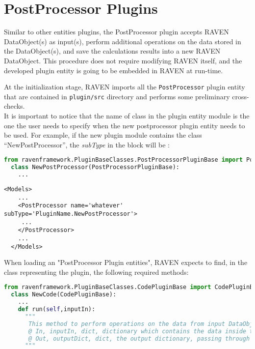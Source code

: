 \section{PostProcessor Plugins}
\label{sec:postprocessorPlugins}

Similar to other entities plugins, the PostProcessor plugin accepts RAVEN DataObject(s) as input(s),
perform additional operations on the data stored in the DataObject(s), and save the calculations
results into a new RAVEN DataObject. This procedure does not require modifying RAVEN itself, and the
developed plugin entity is going to be embedded in RAVEN at run-time.

At the initialization stage, RAVEN imports all the \texttt{PostProcessor} plugin entity that are contained in
\texttt{plugin/src} directory and performs some preliminary cross-checks.
\\It is important to notice that the name of class in the plugin entity module is the one
the user needs to specify when the new postprocessor plugin entity needs to be used.
For example, if the new plugin module contains the class ``NewPostProcessor'',
the \textit{subType} in the  block will be :
\begin{lstlisting}[language=python, basicstyle=\scriptsize\ttfamily, breaklines=True, columns=fullflexible]
  from ravenframework.PluginBaseClasses.PostProcessorPluginBase import PostProcessorPluginBase
  class NewPostProcessor(PostProcessorPluginBase):
    ...
\end{lstlisting}
\begin{lstlisting}[style=XML,morekeywords={name,file}] %moreemph={name,file}]
  <Models>
    ...
    <PostProcessor name='whatever' subType='PluginName.NewPostProcessor'>
     ...
    </PostProcessor>
    ...
  </Models>
\end{lstlisting}

When loading an "PostProcessor Plugin entities", RAVEN expects to find, in the class
representing the plugin, the following required methods:
\begin{lstlisting}[language=python, basicstyle=\scriptsize\ttfamily, breaklines=True, columns=fullflexible]
  from ravenframework.PluginBaseClasses.CodePluginBase import CodePluginBase
  class NewCode(CodePluginBase):
    ...
    def run(self,inputIn):
      """
       This method to perform operations on the data from input DataObject(s)
       @ In, inputIn, dict, dictionary which contains the data inside the input DataObject
       @ Out, outputDict, dict, the output dictionary, passing through HistorySet info
      """
\end{lstlisting}

